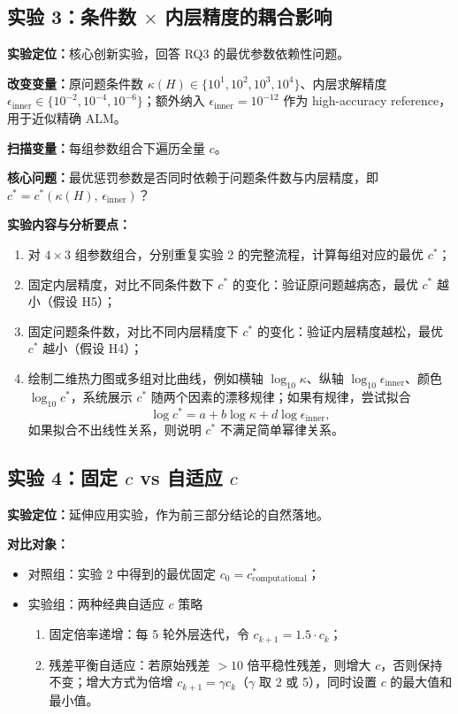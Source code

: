 \documentclass[UTF8]{ctexart}
\numberwithin{figure}{section}
\theoremstyle{definition}
\theoremstyle{examplestyle}
\theoremstyle{remark}
\begin{document}
\subsection{实验 3：条件数 $\times$ 内层精度的耦合影响}
\label{sec:exp3}

\textbf{实验定位：}核心创新实验，回答 RQ3 的最优参数依赖性问题。

\textbf{改变变量：}原问题条件数 $\kappa(H)\in\{10^1,10^2,10^3,10^4\}$、内层求解精度 $\epsilon_{\mathrm{inner}}\in\{10^{-2},10^{-4},10^{-6}\}$；额外纳入 $\epsilon_{\mathrm{inner}}=10^{-12}$ 作为 high-accuracy reference，用于近似精确 ALM。

\textbf{扫描变量：}每组参数组合下遍历全量 $c$。

\textbf{核心问题：}最优惩罚参数是否同时依赖于问题条件数与内层精度，即 $c^*=c^*(\kappa(H),\,\epsilon_{\mathrm{inner}})$？

\textbf{实验内容与分析要点：}
\begin{enumerate}
\item 对 $4\times3$ 组参数组合，分别重复实验 2 的完整流程，计算每组对应的最优 $c^*$；
\item 固定内层精度，对比不同条件数下 $c^*$ 的变化：验证原问题越病态，最优 $c^*$ 越小（假设 H5）；
\item 固定问题条件数，对比不同内层精度下 $c^*$ 的变化：验证内层精度越松，最优 $c^*$ 越小（假设 H4）；
\item 绘制二维热力图或多组对比曲线，例如横轴 $\log_{10}\kappa$、纵轴 $\log_{10}\epsilon_{\mathrm{inner}}$、颜色 $\log_{10}c^*$，系统展示 $c^*$ 随两个因素的漂移规律；如果有规律，尝试拟合
\[
\log c^*=a+b\log\kappa+d\log\epsilon_{\mathrm{inner}},
\]
如果拟合不出线性关系，则说明 $c^*$ 不满足简单幂律关系。
\end{enumerate}

\subsection{实验 4：固定 $c$ vs 自适应 $c$}
\label{sec:exp4}

\textbf{实验定位：}延伸应用实验，作为前三部分结论的自然落地。

\textbf{对比对象：}
\begin{itemize}
\item 对照组：实验 2 中得到的最优固定 $c_0=c^*_{\mathrm{computational}}$；
\item 实验组：两种经典自适应 $c$ 策略
\begin{enumerate}
\item 固定倍率递增：每 5 轮外层迭代，令 $c_{k+1}=1.5\cdot c_k$；
\item 残差平衡自适应：若原始残差 $>10$ 倍平稳性残差，则增大 $c$，否则保持不变；增大方式为倍增 $c_{k+1}=\gamma c_k$（$\gamma$ 取 2 或 5），同时设置 $c$ 的最大值和最小值。
\end{enumerate}
\end{itemize}
\end{document}
